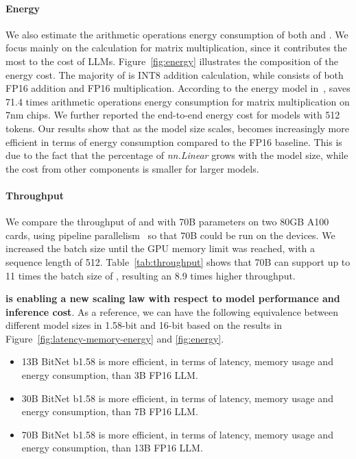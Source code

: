 \paragraph{Energy}

We also estimate the arithmetic operations energy consumption of both  and .
We focus mainly on the calculation for matrix multiplication, since it contributes the most to the cost of LLMs. Figure~\ref{fig:energy} illustrates the composition of the energy cost. The majority of  is INT8 addition calculation, while  consists of both FP16 addition and FP16 multiplication. According to the energy model in~\cite{energycost, pokebnn},  saves 71.4 times arithmetic operations energy consumption for matrix multiplication on 7nm chips. We further reported the end-to-end energy cost for models with 512 tokens. Our results show that as the model size scales,  becomes increasingly more efficient in terms of energy consumption compared to the FP16  baseline. This is due to the fact that the percentage of \emph{nn.Linear} grows with the model size, while the cost from other components is smaller for larger models.

\paragraph{Throughput}

We compare the throughput of  and  with 70B parameters on two 80GB A100 cards, using pipeline parallelism~\cite{gpipe} so that  70B could be run on the devices. We increased the batch size until the GPU memory limit was reached, with a sequence length of 512. Table~\ref{tab:throughput} shows that  70B can support up to 11 times the batch size of , resulting an 8.9 times higher throughput.

\textbf{ is enabling a new scaling law with respect to model performance and inference cost}. As a reference, we can have the following equivalence between different model sizes in 1.58-bit and 16-bit based on the results in Figure~\ref{fig:latency-memory-energy} and \ref{fig:energy}.

\begin{itemize}
    \item 13B BitNet b1.58 is more efficient, in terms of latency, memory usage and energy consumption, than 3B FP16 LLM.
    \item 30B BitNet b1.58 is more efficient, in terms of latency, memory usage and energy consumption, than 7B FP16 LLM.
    \item 70B BitNet b1.58 is more efficient, in terms of latency, memory usage and energy consumption, than 13B FP16 LLM.
\end{itemize}

